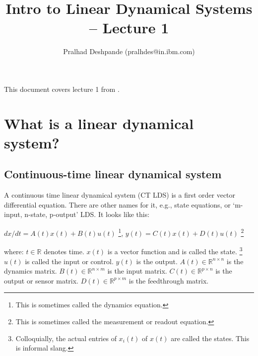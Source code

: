 \documentclass{../tufte-handout}
\title{Intro to Linear Dynamical Systems -- Lecture 1}
\author{Pralhad Deshpande  (pralhdes@in.ibm.com)}
\begin{document}
\maketitle%



This document covers lecture 1 from \cite{boyd-lds-2008}.

\section{What is a linear dynamical system?}


\subsection{Continuous-time linear dynamical system}

A continuous time linear dynamical system (CT LDS) is a first order vector differential equation. There are other names for it, e.g., state equations, or `m-input, n-state, p-output' LDS. It looks like this: 

\vspace{0.15in}
$dx/dt = A(t)x(t) + B(t)u(t)$ \footnote{This is sometimes called the dynamics equation.},
\newline
$y(t) = C(t)x(t) + D(t)u(t)$ \footnote{This is sometimes called the measurement or readout equation.} \hspace{0.25in}
\vspace{0.15in}

where: \newline
$t \in \mathbb{R}$ denotes time.  \newline
$x(t)$ is a vector function and is called the state. \footnote{Colloquially, the actual entries of $x_i(t)$ of $x(t)$ are called the states. This is informal slang.} \newline
$u(t)$ is called the input or control. \newline
$y(t)$ is the output. \newline
$A(t) \in \mathbb{R}^{n \times n}$ is the dynamics matrix.\newline
$B(t) \in \mathbb{R}^{n \times m}$ is the input matrix.\newline
$C(t) \in \mathbb{R}^{p \times n}$ is the output or sensor matrix.\newline
$D(t) \in \mathbb{R}^{p \times m}$ is the feedthrough matrix.\newline
\end{document}

